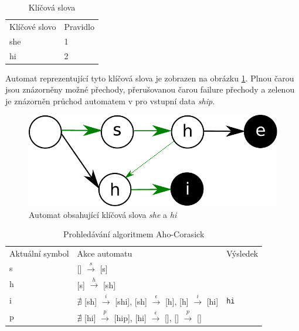 \begin{table}[!htbp]
    \center
    \begin{tabular}{|l|l|}
    \hline
    Klíčové slovo & Pravidlo \\ \hhline{|=|=|}
    she & 1  \\ \hline
    hi & 2 \\ \hline
    \end{tabular}
    \caption{Klíčová slova}
    \label{tab:pm-keywords}
\end{table}

Automat reprezentující tyto klíčová slova je zobrazen na obrázku \ref{fig:ac}.
Plnou čarou jsou znázorněny možné přechody, přerušovanou čarou failure přechody a zelenou
je znázorněn průchod automatem v pro vstupní data \textit{ship}.


\begin{figure}[!htbp]
    \centering
    \includegraphics[scale=.55]{fig/ac.pdf}
    \caption{Automat obsahující klíčová slova \textit{she} a \textit{hi}}
    \label{fig:ac}
\end{figure}

\begin{table}[!htbp]
	\center
    \begin{tabular}{|l|l|l|}
    \hline
    Aktuální symbol & Akce automatu & Výsledek \\ \hhline{|=|=|=|}
    s & [] $\overset{s}{\rightarrow}$ [s] &  \\ \hline
    h & [s] $\overset{h}{\rightarrow}$ [sh] & \\ \hline
    i & $\nexists$ [sh] $\overset{i}{\rightarrow}$ [shi], [sh] $\overset{\epsilon}{\rightarrow}$ [h], [h] $\overset{i}{\rightarrow}$ [hi] & \texttt{hi} \\ \hline
    p & $\nexists$ [hi] $\overset{p}{\rightarrow}$ [hip], [hi] $\overset{\epsilon}{\rightarrow}$ [], [] $\overset{p}{\rightarrow}$ [] &  \\ \hline
    \end{tabular}
    \caption{Prohledávání algoritmem Aho-Corasick}
	\label{tab:pm-match}
\end{table}


